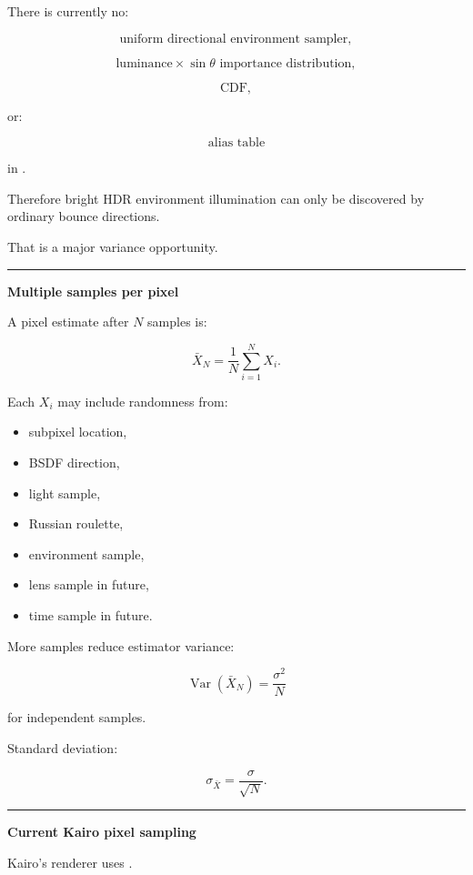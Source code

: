There is currently no:

\[
\text{uniform directional environment sampler},
\]

\[
\text{luminance}\times\sin\theta\text{ importance distribution},
\]

\[
\text{CDF},
\]

or:

\[
\text{alias table}
\]

in .

Therefore bright HDR environment illumination can only be discovered by ordinary bounce directions.

That is a major variance opportunity.

\begin{center}\rule{0.5\linewidth}{0.5pt}\end{center}

\textbf{Multiple samples per pixel}

A pixel estimate after \(N\) samples is:

\[
\boxed{
\bar X_N
=
\frac1N
\sum_{i=1}^NX_i.
}
\]

Each \(X_i\) may include randomness from:

\begin{itemize}
\tightlist
\item
  subpixel location,
\item
  BSDF direction,
\item
  light sample,
\item
  Russian roulette,
\item
  environment sample,
\item
  lens sample in future,
\item
  time sample in future.
\end{itemize}

More samples reduce estimator variance:

\[
\operatorname{Var}(\bar X_N)
=
\frac{\sigma^2}{N}
\]

for independent samples.

Standard deviation:

\[
\boxed{
\sigma_{\bar X}
=
\frac{\sigma}{\sqrt N}.
}
\]

\begin{center}\rule{0.5\linewidth}{0.5pt}\end{center}

\textbf{Current Kairo pixel sampling}

Kairo's renderer uses .

